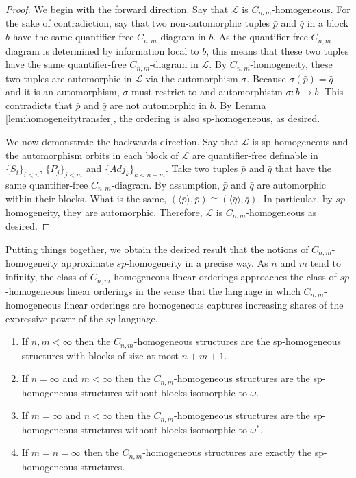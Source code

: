 \documentclass[11pt]{amsart}
\theoremstyle{definition}
\def\L{\mathcal L}
\begin{document}
\begin{proof}
    We begin with the forward direction.
    Say that $\L$ is $C_{n,m}$-homogeneous.
    For the sake of contradiction, say that two non-automorphic tuples $\bar{p}$ and $\bar{q}$ in a block $b$ have the same quantifier-free $C_{n,m}$-diagram in $b$.
    As the quantifier-free $C_{n,m}$-diagram is determined by information local to $b$, this means that these two tuples have the same quantifier-free $C_{n,m}$-diagram in $\L$.
    By $C_{n,m}$-homogeneity, these two tuples are automorphic in $\L$ via the automorphism $\sigma$.
    Because $\sigma(\bar{p})=\bar{q}$ and it is an automorphism, $\sigma$ must restrict to and automorphistm $\sigma:b\to b$.
    This contradicts that $\bar{p}$ and $\bar{q}$ are not automorphic in $b$.
    By Lemma \ref{lem:homogeneitytransfer}, the ordering is also sp-homogeneous, as desired.

    We now demonstrate the backwards direction.
    Say that $\L$ is sp-homogeneous and the automorphism orbits in each block of $\L$ are quantifier-free definable in $\{S_i\}_{i<n}$, $\{P_j\}_{j<m}$ and $\{Adj_k\}_{k<n+m}$.
    Take two tuples $\bar{p}$ and $\bar{q}$ that have the same quantifier-free $C_{n,m}$-diagram.
    By assumption, $\bar{p}$ and $\bar{q}$ are automorphic within their blocks.
    What is the same, $(\langle\bar{p}\rangle,\bar{p})\cong(\langle\bar{q}\rangle,\bar{q})$.
    In particular, by $sp$-homogeneity, they are automorphic.
    Therefore, $\L$ is $C_{n,m}$-homogeneous as desired.
\end{proof}

Putting things together, we obtain the desired result that the notions of $C_{n,m}$-homogeneity approximate $sp$-homogeneity in a precise way.
As $n$ and $m$ tend to infinity, the class of $C_{n,m}$-homogeneous linear orderings approaches the class of $sp$-homogeneous linear orderings in the sense that the language in which $C_{n,m}$-homogeneous linear orderings are homogeneous captures increasing shares of the expressive power of the $sp$ language.


\begin{theorem}\label{thm:CnmClassify}
    \begin{enumerate}
        \item If $n,m<\infty$ then the $C_{n,m}$-homogeneous structures are the sp-homogeneous structures with blocks of size at most $n+m+1$.
        \item If $n=\infty$ and $m<\infty$ then the $C_{n,m}$-homogeneous structures are the sp-homogeneous structures without blocks isomorphic to $\omega$.
        \item If $m=\infty$ and $n<\infty$ then the $C_{n,m}$-homogeneous structures are the sp-homogeneous structures without blocks isomorphic to $\omega^*$.
        \item If $m=n=\infty$ then the $C_{n,m}$-homogeneous structures are exactly the sp-homogeneous structures.
    \end{enumerate}
\end{theorem}
\end{document}
